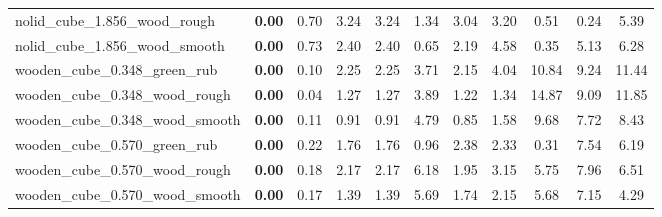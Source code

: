\begin{table}[H]
{\begin{tabular}{l cccccccccc}
        nolid\_cube\_1.856\_wood\_rough & \textbf{0.00} & 0.70 & 3.24 & 3.24 & 1.34 & 3.04 & 3.20 & 0.51 & 0.24 & 5.39 \\
        nolid\_cube\_1.856\_wood\_smooth & \textbf{0.00} & 0.73 & 2.40 & 2.40 & 0.65 & 2.19 & 4.58 & 0.35 & 5.13 & 6.28 \\
        wooden\_cube\_0.348\_green\_rub & \textbf{0.00} & 0.10 & 2.25 & 2.25 & 3.71 & 2.15 & 4.04 & 10.84 & 9.24 & 11.44 \\
        wooden\_cube\_0.348\_wood\_rough & \textbf{0.00} & 0.04 & 1.27 & 1.27 & 3.89 & 1.22 & 1.34 & 14.87 & 9.09 & 11.85 \\
        wooden\_cube\_0.348\_wood\_smooth & \textbf{0.00} & 0.11 & 0.91 & 0.91 & 4.79 & 0.85 & 1.58 & 9.68 & 7.72 & 8.43 \\
        wooden\_cube\_0.570\_green\_rub & \textbf{0.00} & 0.22 & 1.76 & 1.76 & 0.96 & 2.38 & 2.33 & 0.31 & 7.54 & 6.19 \\
        wooden\_cube\_0.570\_wood\_rough & \textbf{0.00} & 0.18 & 2.17 & 2.17 & 6.18 & 1.95 & 3.15 & 5.75 & 7.96 & 6.51 \\
        wooden\_cube\_0.570\_wood\_smooth & \textbf{0.00} & 0.17 & 1.39 & 1.39 & 5.69 & 1.74 & 2.15 & 5.68 & 7.15 & 4.29 \\
        \bottomrule
    \end{tabular}
    }
\end{table}



\vspace{1cm}

\clearpage

